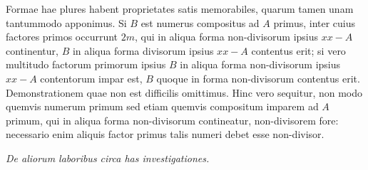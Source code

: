 Formae hae plures habent proprietates satis memorabiles, quarum tamen unam tantummodo apponimus. Si $B$ est numerus compositus ad $A$ primus, inter cuius factores primos occurrunt $2m$, qui in aliqua forma non-divisorum ipsius $xx-A$ continentur, $B$ in aliqua forma divisorum ipsius $xx-A$ contentus erit; si vero multitudo factorum primorum ipsius $B$ in aliqua forma non-divisorum ipsius $xx-A$ contentorum impar est, $B$ quoque in forma non-divisorum contentus erit. Demonstrationem quae non est difficilis omittimus. Hinc vero sequitur, non modo quemvis numerum primum sed etiam quemvis compositum imparem ad $A$ primum, qui in aliqua forma non-divisorum contineatur, non-divisorem fore: necessario enim aliquis factor primus talis numeri debet esse non-divisor.

\begin{center}
\textit{De aliorum laboribus circa has investigationes.}
\end{center}

